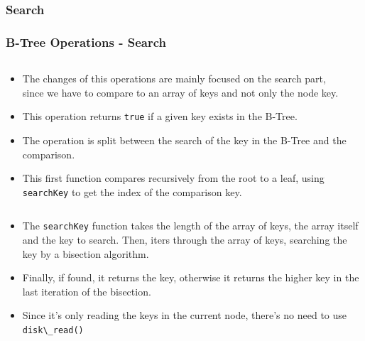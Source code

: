 \documentclass{beamer}
\begin{document}
\begin{frame}[t,allowframebreaks]
    \subsubsection{Search}
    \frametitle{B-Tree Operations - Search}
    \vspace{-1cm}
    \begin{columns}
        \begin{column}{\textlecolumn}
            \begin{block}{}
                \begin{itemize}
                    \item The changes of this operations are mainly focused on the search part, since we have to compare to an array of keys and not only the node key.
                    \item This operation returns \lstinline|true| if a given key exists in the B-Tree.
                    \item The operation is split between the search of the key in the B-Tree and the comparison.
                    \item This first function compares recursively from the root to a leaf, using \lstinline|searchKey| to get the index of the comparison key.
                \end{itemize}
            \end{block}
        \end{column}
        \begin{column}{\textricolumn}
        \end{column}
    \end{columns}
    \btreeSearch
    \vspace{-1cm}
    \begin{columns}
        \begin{column}{\textlecolumn}
            \begin{block}{}
                \begin{itemize}
                    \item The \lstinline|searchKey| function takes the length of the array of keys, the array itself and the key to search. Then, iters through the array of keys, searching the key by a bisection algorithm.
                    \item Finally, if found, it returns the key, otherwise it returns the higher key in the last iteration of the bisection.
                    \item Since it's only reading the keys in the current node, there's no need to use \lstinline|disk\_read()|

\end{itemize}
\end{block}
\end{column}
\end{columns}
\end{frame}
\end{document}

